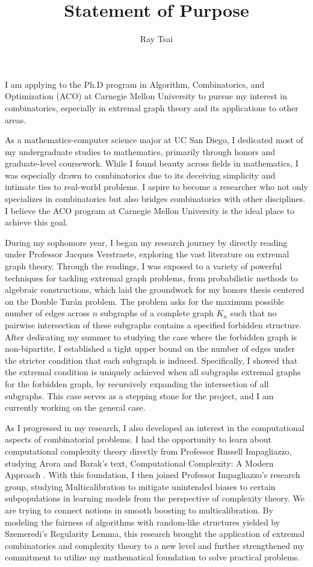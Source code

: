 \documentclass[12pt]{article}
\title{Statement of Purpose}
\author{Ray Tsai}
\date{}
\begin{document}
\maketitle

\vspace{-0.25in}

I am applying to the Ph.D program in Algorithm, Combinatorics, and Optimization (ACO) at Carnegie
Mellon University to pursue my interest in combinatorics, especially in extremal graph theory and
its applications to other areas. 

As a mathematics-computer science major at UC San Diego, I dedicated most of my undergraduate
studies to mathematics, primarily through honors and graduate-level coursework. While I found beauty
across fields in mathematics, I was especially drawn to combinatorics due to its deceiving
simplicity and intimate ties to real-world problems. I aspire to become a researcher who not only
specializes in combinatorics but also bridges combinatorics with other disciplines. I believe the
ACO program at Carnegie Mellon University is the ideal place to achieve this goal.

During my sophomore year, I began my research journey by directly reading under Professor Jacques
Verstraete, exploring the vast literature on extremal graph theory. Through the readings, I was
exposed to a variety of powerful techniques for tackling extremal graph problems, from probabilistic
methods to algebraic constructions, which laid the groundwork for my honors thesis centered on the
Double Turán problem. The problem asks for the maximum possible number of edges across $n$ subgraphs
of a complete graph $K_n$ such that no pairwise intersection of these subgraphs contains a specified
forbidden structure. After dedicating my summer to studying the case where the forbidden graph is
non-bipartite, I established a tight upper bound on the number of edges under the stricter condition
that each subgraph is induced. Specifically, I showed that the extremal condition is uniquely
achieved when all subgraphs extremal graphs for the forbidden graph, by recursively expanding the
intersection of all subgraphs. This case serves as a stepping stone for the project, and I am
currently working on the general case. 

As I progressed in my research, I also developed an interest in the computational aspects of
combinatorial problems. I had the opportunity to learn about computational complexity theory
directly from Professor Russell Impagliazzo, studying Arora and Barak's text, Computational
Complexity: A Modern Approach \cite{arora2009computational}. With this foundation, I then joined
Professor Impagliazzo's research group, studying Multicalibration to mitigate unintended biases to
certain subpopulations in learning models from the perspective of complexity theory. We are trying
to connect notions in smooth boosting to multicalibration. By modeling the fairness of algorithms
with random-like structures yielded by Szemeredi's Regularity Lemma, this research brought the
application of extremal combinatorics and complexity theory to a new level and further strengthened
my commitment to utilize my mathematical foundation to solve practical problems.
\end{document}
